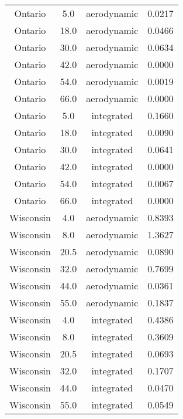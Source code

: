 \documentclass{article}
\begin{document}
\begin{longtable}[H]{cccc}
Ontario   & 5.0  & aerodynamic & 0.0217 \\
Ontario   & 18.0 & aerodynamic & 0.0466 \\
Ontario   & 30.0 & aerodynamic & 0.0634 \\
Ontario   & 42.0 & aerodynamic & 0.0000 \\
Ontario   & 54.0 & aerodynamic & 0.0019 \\
Ontario   & 66.0 & aerodynamic & 0.0000 \\
Ontario   & 5.0  & integrated & 0.1660 \\
Ontario   & 18.0 & integrated & 0.0090 \\
Ontario   & 30.0 & integrated & 0.0641 \\
Ontario   & 42.0 & integrated & 0.0000 \\
Ontario   & 54.0 & integrated & 0.0067 \\
Ontario   & 66.0 & integrated & 0.0000 \\
Wisconsin & 4.0  & aerodynamic & 0.8393 \\
Wisconsin & 8.0  & aerodynamic & 1.3627 \\
Wisconsin & 20.5 & aerodynamic & 0.0890 \\
Wisconsin & 32.0 & aerodynamic & 0.7699 \\
Wisconsin & 44.0 & aerodynamic & 0.0361 \\
Wisconsin & 55.0 & aerodynamic & 0.1837 \\
Wisconsin & 4.0  & integrated & 0.4386 \\
Wisconsin & 8.0  & integrated & 0.3609 \\
Wisconsin & 20.5 & integrated & 0.0693 \\
Wisconsin & 32.0 & integrated & 0.1707 \\
Wisconsin & 44.0 & integrated & 0.0470 \\
Wisconsin & 55.0 & integrated & 0.0549 \\ \hline
\end{longtable}



\pagebreak
\end{document}

